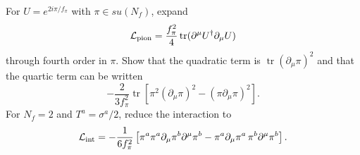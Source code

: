 For $U=e^{2i\pi/f_\pi}$ with $\pi\in su(N_f)$, expand
\begin{equation}
    \mathcal L_{\rm pion}
    =\frac{f_\pi^2}{4}
    \operatorname{tr}(\partial^\mu U^\dagger\partial_\mu U)
\end{equation}
through fourth order in $\pi$. Show that the quadratic term is
$\operatorname{tr}(\partial_\mu\pi)^2$ and that the quartic term
can be written
\begin{equation}
    -\frac{2}{3f_\pi^2}\operatorname{tr}\left[
    \pi^2(\partial_\mu\pi)^2
    -(\pi\partial_\mu\pi)^2\right].
\end{equation}
For $N_f=2$ and $T^a=\sigma^a/2$, reduce the interaction to
\begin{equation}
    \mathcal L_{\rm int}=-\frac1{6f_\pi^2}
    \left[\pi^a\pi^a\partial_\mu\pi^b\partial^\mu\pi^b
    -\pi^a\partial_\mu\pi^a\,
    \pi^b\partial^\mu\pi^b\right].
\end{equation}
